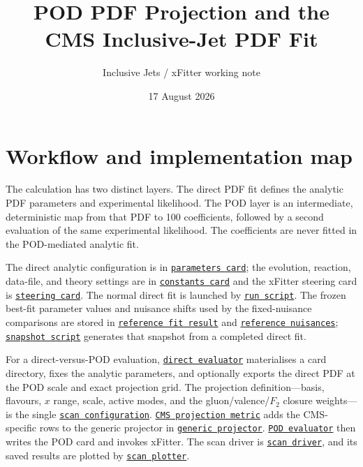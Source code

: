 \documentclass[11pt]{article}
\title{POD PDF Projection and the CMS Inclusive-Jet PDF Fit}
\author{Inclusive Jets / xFitter working note}
\date{17 August 2026}
\newcommand{\incljetscode}[2]{\href{https://github.com/HephyAnalysisSW/InclJets/blob/main/#1}{\texttt{#2}}}
\begin{document}
\maketitle
\section{Workflow and implementation map}

The calculation has two distinct layers. The direct PDF fit defines the
analytic PDF parameters and experimental likelihood. The POD layer is an
intermediate, deterministic map from that PDF to 100 coefficients, followed
by a second evaluation of the same experimental likelihood. The coefficients
are never fitted in the POD-mediated analytic fit.

The direct analytic configuration is in
\incljetscode{fits/SMP-22-014/figure2/central/parameters.yaml}{parameters card};
the evolution, reaction, data-file, and theory settings are in
\incljetscode{fits/SMP-22-014/figure2/central/constants.yaml}{constants card}
and the xFitter steering card is
\incljetscode{fits/SMP-22-014/figure2/central/steering.txt}{steering card}.
The normal direct fit is launched by
\incljetscode{fits/SMP-22-014/figure2/central/run.sh}{run script}.
The frozen best-fit parameter values and nuisance shifts used by the
fixed-nuisance comparisons are stored in
\incljetscode{fits/SMP-22-014/figure2/reference_fit/fit_result.yaml}{reference fit result}
and
\incljetscode{fits/SMP-22-014/figure2/reference_fit/nuisances.yaml}{reference nuisances};
\incljetscode{fits/SMP-22-014/figure2/tools/create_reference_fit.py}{snapshot script}
generates that snapshot from a completed direct fit.

For a direct-versus-POD evaluation,
\incljetscode{fits/SMP-22-014/figure2/likelihood_scans/evaluate_direct.py}{direct evaluator}
materialises a card directory, fixes the analytic parameters, and optionally
exports the direct PDF at the POD scale and exact projection grid. The
projection definition---basis, flavours, $x$ range, scale, active modes, and
the gluon/valence/$F_2$ closure weights---is the single
\incljetscode{fits/SMP-22-014/figure2/likelihood_scans/scan_config.yaml}{scan configuration}.
\incljetscode{fits/SMP-22-014/figure2/likelihood_scans/projection_metrics.py}{CMS projection metric}
adds the CMS-specific rows to the generic projector in
\incljetscode{pod_projection/pod_projection.py}{generic projector}.
\incljetscode{fits/SMP-22-014/figure2/likelihood_scans/evaluate_pod.py}{POD evaluator}
then writes the POD card and invokes xFitter. The scan driver is
\incljetscode{fits/SMP-22-014/figure2/likelihood_scans/run_likelihood_scan.py}{scan driver},
and its saved results are plotted by
\incljetscode{fits/SMP-22-014/figure2/likelihood_scans/plot_likelihood_scan.py}{scan plotter}.
\end{document}
